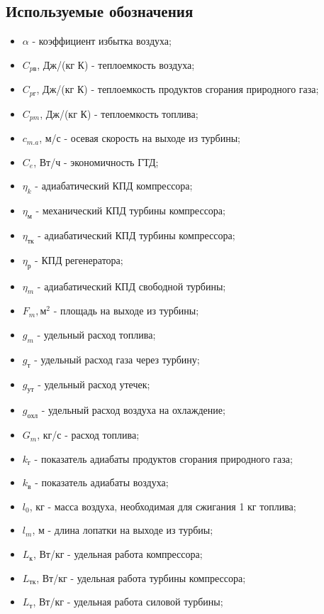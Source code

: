 
\subsection{Используемые обозначения}
\begin{itemize}
    \item[] $\alpha$ - коэффициент избытка воздуха;
    \item[] $C_{pв}$, Дж/(кг К) - теплоемкость воздуха;
    \item[] $C_{pг}$, Дж/(кг К) - теплоемкость продуктов сгорания природного газа;
    \item[] $C_{pm}$, Дж/(кг К) - теплоемкость топлива;
    \item[] $c_{m.a}$, м/с - осевая скорость на выходе из турбины;
    \item[] $C_e$, Вт/ч - экономичность ГТД;
    \item[] $\eta_k$ - адиабатический КПД компрессора;
    \item[] $\eta_м$ - механический КПД турбины компрессора;
    \item[] $\eta_{тк}$ - адиабатический КПД турбины компрессора;
    \item[] $\eta_р$ - КПД регенератора;
    \item[] $\eta_m$ - адиабатический КПД свободной турбины;
    \item[] $F_m, м^2$ - площадь на выходе из турбины;
    \item[] $g_m$ - удельный расход топлива;
    \item[] $g_т$ - удельный расход газа через турбину;
    \item[] $g_{ут}$ - удельный расход утечек;
    \item[] $g_{охл}$ - удельный расход воздуха на охлаждение;
    \item[] $G_m$, кг/с - расход топлива;
    \item[] $k_г$ - показатель адиабаты продуктов сгорания природного газа;
    \item[] $k_в$ - показатель адиабаты воздуха;
    \item[] $l_0$, кг - масса воздуха, необходимая для сжигания 1 кг топлива;
    \item[] $l_m$, м - длина лопатки на выходе из турбиы;
    \item[] $L_к$, Вт/кг - удельная работа компрессора;
    \item[] $L_{тк}$, Вт/кг - удельная работа турбины компрессора;
    \item[] $L_т$, Вт/кг - удельная работа силовой турбины;

\end{itemize}
